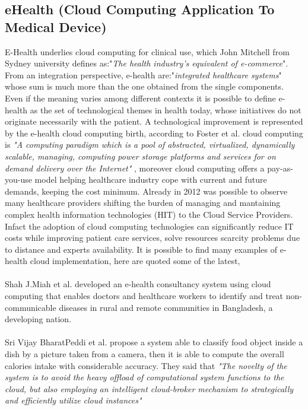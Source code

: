 \subsection{eHealth (Cloud Computing Application To Medical Device)}
E-Health underlies cloud computing for clinical use, which John Mitchell from Sydney university defines as:"\textit{The health industry's equivalent of e-commerce}". From an integration perspective, e-health are:"\textit{integrated healthcare systems}" whose sum is much more than the one obtained from the single components. Even if the meaning varies among different contexts \cite{Eysenbach} it is possible to define e-health as the set of technological themes in health today, whose initiatives do not originate necessarily with the patient. \cite{oh}\cite{DellaMea}
A technological improvement is represented by the e-health cloud computing birth, according to Foster et al. cloud computing is \textit{"A computing paradigm which is a pool of abstracted, virtualized, dynamically scalable, managing, computing power storage platforms and services  for on demand delivery over the Internet"} \cite{foster}, moreover cloud computing offers a pay-as-you-use model helping healthcare industry cope with current and future demands, keeping the cost minimum. \cite{AbuKhousa}
Already in 2012 was possible to observe many healthcare providers shifting the burden of managing and mantaining complex health information technologies (HIT) to the Cloud Service Providers. \cite{foster}
Infact the adoption of cloud computing technologies can significantly reduce IT costs while improving patient care services, solve resources scarcity problems due to distance and experts availability. \cite{AbuKhousa}
It is possible to find many examples of e-health cloud implementation, here are quoted some of the latest,\\\\
Shah J.Miah et al. developed an e-health consultancy system using cloud computing that enables doctors and healthcare workers to identify and treat non-communicable diseases in rural and remote communities in Bangladesh, a developing nation. \cite{MIAH2017311}\\\\
Sri Vijay BharatPeddi et al. propose a system able to classify food object inside a dish by a picture taken from a camera, then it is able to compute the overall calories intake with considerable accuracy. They said that \textit{"The novelty of the system is to avoid the  heavy offload of computational system functions to the cloud, but also employing an intelligent cloud-broker mechanism to strategically and efficiently utilize cloud instances"} \cite{PEDDI201771}\\\\
